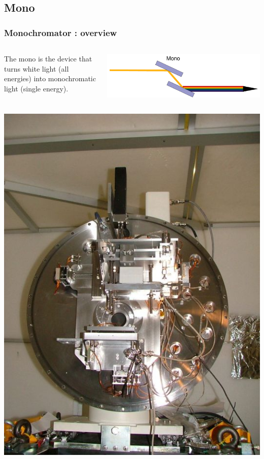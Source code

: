 \documentclass[10pt, xcolor=x11names, compress]{beamer}
\begin{document}
\subsection{Mono}
\begin{frame}
  \frametitle{Monochromator : overview}
  \begin{columns}
    \begin{column}{0.6\linewidth}
      The mono is the device that turns white light (all energies)
      into monochromatic light (single energy).
    \end{column}
    \begin{column}{0.4\linewidth}
      \includegraphics[width=\linewidth]{bl/mono.pdf}  
    \end{column}
  \end{columns}
  \begin{columns}
    \begin{column}{0.5\linewidth}
      \begin{center}
        \includegraphics[width=0.8\linewidth]{bl/mono_interior.jpg}

\end{center}
\end{column}
\end{columns}
\end{frame}
\end{document}
